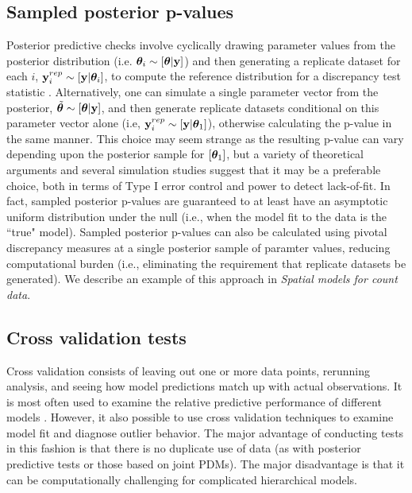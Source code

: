 \documentclass[12pt,english]{article}
\begin{document}
\begin{spacing}{1.9}
\subsection{Sampled posterior p-values}

Posterior predictive checks involve cyclically drawing parameter values from the posterior distribution (i.e. $\boldsymbol{\theta}_i \sim [\boldsymbol{\theta}| {\bf y}]$) and then generating a replicate dataset for each $i$, ${\bf y}_i^{rep} \sim [{\bf y} | \boldsymbol{\theta}_i]$, to compute the reference distribution for a discrepancy test statistic \citep[][; Alg. \ref{alg:posterior}]{GelmanEtAl2004}.  Alternatively, one can simulate a single parameter vector from the posterior, $\tilde{\boldsymbol{\theta}} \sim [\boldsymbol{\theta}| {\bf y}]$, and then generate replicate datasets conditional on this parameter vector alone (i.e, ${\bf y}_i^{rep} \sim [{\bf y} | \boldsymbol{\theta}_1]$), otherwise calculating the p-value in the same manner.  This choice may seem strange as the resulting p-value can vary depending upon the posterior sample for $[\boldsymbol{\theta}_1]$, but a variety of theoretical arguments \citep[e.g.][]{Johnson2004,Johnson2007,YuanJohnson2012,Gosselin2011} and several simulation studies \citep[e.g.][]{Gosselin2011,Zhang2014} suggest that it may be a preferable choice, both in terms of Type I error control and power to detect lack-of-fit.  In fact, sampled posterior p-values are guaranteed to at least have an asymptotic uniform distribution under the null \citep{Gosselin2011} (i.e., when the model fit to the data is the ``true" model).  Sampled posterior p-values can also be calculated using pivotal discrepancy measures at a single posterior sample of paramter values, reducing computational burden (i.e., eliminating the requirement that replicate datasets be generated). We describe an example of this approach in \textit{Spatial models for count data}.

\subsection{Cross validation tests}

Cross validation consists of leaving out one or more data points, rerunning analysis, and seeing how model predictions match up with actual observations.  It is most often used to examine the relative predictive performance of different models \citep[i.e., for model selection; see e.g.][]{ArlotCelisse2010}.  However, it also possible to use cross validation techniques to examine model fit and diagnose outlier behavior.  The major advantage of conducting tests in this fashion is that there is no duplicate use of data (as with posterior predictive tests or those based on joint PDMs).  The major disadvantage is that it can be computationally challenging for complicated hierarchical models.


\end{spacing}
\end{document}
